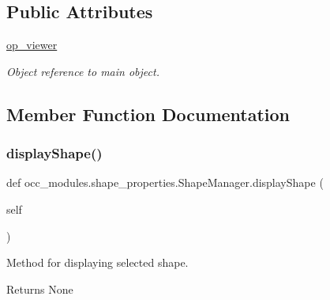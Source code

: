 \subsection*{Public Attributes}
\begin{DoxyCompactItemize}
\item 
\hypertarget{a00101_ad60197d66a3c059f30f32c2ab1a12841}{}\label{a00101_ad60197d66a3c059f30f32c2ab1a12841} 
\hyperlink{a00101_ad60197d66a3c059f30f32c2ab1a12841}{op\+\_\+viewer}
\begin{DoxyCompactList}\small\item\em Object reference to main object. \end{DoxyCompactList}\end{DoxyCompactItemize}


\subsection{Member Function Documentation}
\hypertarget{a00101_aba26c11e7e7ec6c2c6709a27cbeaaf69}{}\label{a00101_aba26c11e7e7ec6c2c6709a27cbeaaf69} 
\subsubsection{\texorpdfstring{display\+Shape()}{displayShape()}}
{\footnotesize\ttfamily def occ\+\_\+modules.\+shape\+\_\+properties.\+Shape\+Manager.\+display\+Shape (\begin{DoxyParamCaption}\item[{}]{self }\end{DoxyParamCaption})}



Method for displaying selected shape. 

\begin{DoxyReturn}{Returns}
None 
\end{DoxyReturn}
\hypertarget{a00101_ad4293087adb512ea61fe0c3429c0e08c}{}\label{a00101_ad4293087adb512ea61fe0c3429c0e08c} 
